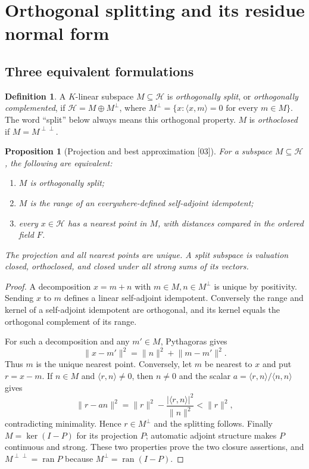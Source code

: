 \documentclass[11pt,letterpaper]{article}
\numberwithin{equation}{section}
\newtheorem{proposition}[proposition]{Proposition}
\theoremstyle{definition}
\newtheorem{definition}[definition]{Definition}
\theoremstyle{remark}
\newcommand{\F}{F}
\newcommand{\K}{K}
\newcommand{\ran}{\operatorname{ran}}
\newcommand{\ip}[2]{\langle #1,#2\rangle}
\newcommand{\norm}[1]{\lVert #1\rVert}
\newcommand{\abs}[1]{\lvert #1\rvert}
\newcommand{\cH}{\mathcal H}
\newcommand{\src}[1]{\textup{\textsf{\small[#1]}}}
\begin{document}
\section{Orthogonal splitting and its residue normal form}
\label{hgeo:sec:splitting}

\subsection{Three equivalent formulations}

\begin{definition}\label{hgeo:def:split}
A $\K$-linear subspace $M\subseteq\cH$ is \emph{orthogonally split}, or
\emph{orthogonally complemented}, if $\cH=M\oplus M^\perp$, where
$M^\perp=\{x:\ip{x}{m}=0\text{ for every }m\in M\}$.
The word ``split'' below always means this orthogonal property. $M$ is
\emph{orthoclosed} if $M=M^{\perp\perp}$.
\end{definition}

\begin{proposition}[Projection and best approximation \src{03}]
\label{hgeo:prop:projection}
For a subspace $M\subseteq\cH$, the following are equivalent:
\begin{enumerate}[label=\textup{(\roman*)}]
\item $M$ is orthogonally split;
\item $M$ is the range of an everywhere-defined self-adjoint idempotent;
\item every $x\in\cH$ has a nearest point in $M$, with distances
compared in the ordered field $\F$.
\end{enumerate}
The projection and all nearest points are unique. A split subspace is
valuation closed, orthoclosed, and closed under all strong sums of its
vectors.
\end{proposition}
\begin{proof}
A decomposition $x=m+n$ with $m\in M,n\in M^\perp$ is unique by
positivity. Sending $x$ to $m$ defines a linear self-adjoint idempotent.
Conversely the range and kernel of a self-adjoint idempotent are
orthogonal, and its kernel equals the orthogonal complement of its
range.

For such a decomposition and any $m'\in M$, Pythagoras gives
\[
 \norm{x-m'}^2=\norm{n}^2+\norm{m-m'}^2.
\]
Thus $m$ is the unique nearest point. Conversely, let $m$ be nearest
to $x$ and put $r=x-m$. If $n\in M$ and $\ip{r}{n}\ne0$, then $n\ne0$
and the scalar $a=\ip{r}{n}/\ip{n}{n}$ gives
\[
 \norm{r-an}^2=\norm{r}^2-
          \frac{\abs{\ip{r}{n}}^2}{\norm{n}^2}<\norm{r}^2,
\]
contradicting minimality. Hence $r\in M^\perp$ and the splitting
follows. Finally $M=\ker(I-P)$ for its projection $P$; automatic
adjoint structure makes $P$ continuous and strong. These two
properties prove the two closure assertions, and $M^{\perp\perp}=
\ran P$ because $M^\perp=\ran(I-P)$.
\end{proof}
\end{document}
